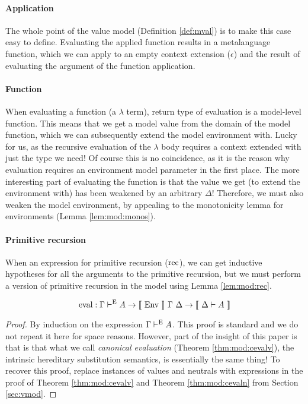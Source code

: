 \documentclass{llncs}
\newcommand{\refdef}[1]{Definition \ref{def:#1}}
\newcommand{\refthm}[1]{Theorem \ref{thm:#1}}
\newcommand{\reflem}[1]{Lemma \ref{lem:#1}}
\newcommand{\refsec}[1]{Section \ref{sec:#1}}
\def\marr{\rightarrow}
\def\lam{\lambda}
\def\emp{\epsilon}
\def\rec{\fun{rec}}
\newcommand{\turn}[1]{\vdash^\con{#1}}
\newcommand{\el}[1]{\llbracket ~ #1 ~ \rrbracket}
\newcommand{\con}[1]{\textmd{#1}}
\newcommand{\fun}[1]{\textmd{#1}}
\newcommand{\dtypm}[1]{\el{\Delta \vdash #1}}
\newcommand{\type}[1]{\Gamma \turn{E} #1}
\def\menv{\el{\fun{Env}}~\Gamma~\Delta}
\begin{document}
\paragraph{Application} The whole point of the value model
(\refdef{mval}) is to make this case easy to define. Evaluating the
applied function results in a metalanguage function, which we can
apply to an empty context extension ($\emp$) and the result of
evaluating the argument of the function application.

\paragraph{Function} When evaluating a function (a $\lam$ term),
return type of evaluation is a model-level function. This means that
we get a model value from the domain of the model function, which we
can subsequently extend the model environment with. Lucky for us, as
the recursive evaluation of the $\lam$ body requires a context extended
with just the type we need! Of course this is no coincidence, as it is
the reason why evaluation requires an environment model parameter in
the first place. The more interesting part of evaluating the function
is that the value we get (to extend the environment with) has been
weakened by an arbitrary $\Delta$! Therefore, we must also weaken the
model environment, by appealing to the monotonicity lemma for
environments (\reflem{mod:monos}).

\paragraph{Primitive recursion} When an expression for primitive
recursion ($\rec$), we can get inductive hypotheses for all the
arguments to the primitive recursion, but we must perform a version of
primitive recursion in the model using \reflem{mod:rec}.

\begin{theorem}
\label{thm:mod:eval}
$$
\fun{eval} : \type{A} \marr \menv \marr \dtypm{A}
$$

\begin{proof}

By induction on the expression $\type{A}$. This proof is standard and
we do not repeat it here for space reasons. However, part of the
insight of this paper is that is that what we call
\textit{canonical evaluation} (\refthm{mod:cevalv}), the intrinsic hereditary substitution
semantics, is essentially the same thing! To recover this proof,
replace instances of values and neutrals with expressions in the proof
of \refthm{mod:cevalv} and \refthm{mod:cevaln} from \refsec{vmod}.

\end{proof}

\end{theorem}
\end{document}
